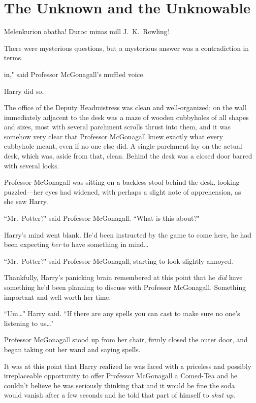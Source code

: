 \chapter{The Unknown and the Unknowable}

\begin{chapterOpeningAuthorNote}
Melenkurion abatha! Duroc minas mill J.~K.~Rowling!
\end{chapterOpeningAuthorNote}
\begin{chapterOpeningQuote}
There were mysterious questions, but a mysterious answer was a contradiction in terms.
\end{chapterOpeningQuote}

 in," said Professor McGonagall's muffled voice.

\hplettrineextrapara
Harry did so.

The office of the Deputy Headmistress was clean and well-organized; on the wall immediately adjacent to the desk was a maze of wooden cubbyholes of all shapes and sizes, most with several parchment scrolls thrust into them, and it was somehow very clear that Professor McGonagall knew exactly what every cubbyhole meant, even if no one else did. A single parchment lay on the actual desk, which was, aside from that, clean. Behind the desk was a closed door barred with several locks.

Professor McGonagall was sitting on a backless stool behind the desk, looking puzzled---her eyes had widened, with perhaps a slight note of apprehension, as she saw Harry.

``Mr.~Potter?" said Professor McGonagall. ``What is this about?"

Harry's mind went blank. He'd been instructed by the game to come here, he had been expecting \emph{her} to have something in mind{\ldots}

``Mr.~Potter?" said Professor McGonagall, starting to look slightly annoyed.

Thankfully, Harry's panicking brain remembered at this point that he \emph{did} have something he'd been planning to discuss with Professor McGonagall. Something important and well worth her time.

``Um{\ldots}" Harry said. ``If there are any spells you can cast to make sure no one's listening to us{\ldots}"

Professor McGonagall stood up from her chair, firmly closed the outer door, and began taking out her wand and saying spells.

It was at this point that Harry realized he was faced with a priceless and possibly irreplaceable opportunity to offer Professor McGonagall a Comed-Tea and he couldn't believe he was seriously thinking that and it would be fine the soda would vanish after a few seconds and he told that part of himself to \emph{shut up}.


